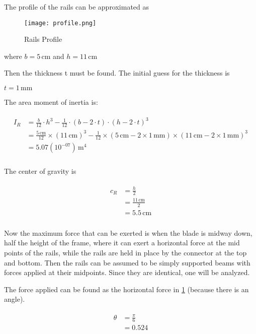 \documentclass{article}
\begin{document}
The profile of the rails can be approximated as

\begin{figure}
	\centering
	\texttt{[image: profile.png]}
	\caption{Rails Profile}
	\label{first}
\end{figure}
where $b = 5\,\mathrm{cm}$ and $h = 11\,\mathrm{cm}$

Then the thickness t must be found. The initial guess for the thickness is

$t = 1\,\mathrm{mm}$

The area moment of inertia is:

\begin{align}
\begin{split}
I_{R}	&= \frac{b}{12} \cdot h^{3} - \frac{1}{12} \cdot \left(b - 2 \cdot t\right) \cdot \left(h - 2 \cdot t\right)^{3}\\
		&= \frac{5\,\mathrm{cm}}{12} \times \left(11\,\mathrm{cm}\right)^{3} - \frac{1}{12} \times \left(5\,\mathrm{cm} - 2 \times 1\,\mathrm{mm}\right) \times \left(11\,\mathrm{cm} - 2 \times 1\,\mathrm{mm}\right)^{3}\\
		&= 5.07(10^{-07})\,\mathrm{m^{4}}\\
\end{split}
\end{align}

The center of gravity is

\begin{align}
\begin{split}
c_{R}	&= \frac{h}{2}\\
		&= \frac{11\,\mathrm{cm}}{2}\\
		&= 5.5\,\mathrm{cm}\\
\end{split}
\end{align}

Now the maximum force that can be exerted is when the blade is midway down, half the height of the frame, where it can exert a horizontal force at the mid points of the rails, while the rails are held in place by the connector at the top and bottom. Then the rails can be assumed to be simply supported beams with forces applied at their midpoints. Since they are identical, one will be analyzed.

The force applied can be found as the horizontal force in \ref{first} (because there is an angle).

\begin{align}
\begin{split}
\theta	&= \frac{\pi}{6}\\
		&= 0.524\\
\end{split}
\end{align}
\end{document}
